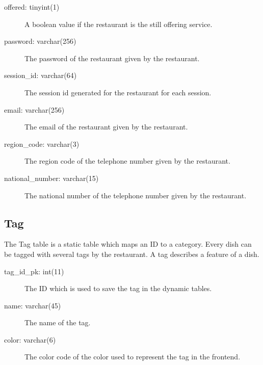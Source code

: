 \begin{description}
        \item[offered: tinyint(1)] A boolean value if the restaurant is the still offering service.
        \item[password: varchar(256)] The password of the restaurant given by the restaurant.
        \item[session\_id: varchar(64)] The session id generated for the restaurant for each session.
        \item[email: varchar(256)] The email of the restaurant given by the restaurant.            
        \item[region\_code: varchar(3)] The region code of the telephone number given by the restaurant.
        \item[national\_number: varchar(15)] The national number of the telephone number given by the restaurant.
    \end{description}

    \subsection{Tag}
    The Tag table is a static table which maps an ID to a category. Every dish can be tagged with several tags by the restaurant. A tag describes a feature of a dish.
    \begin{description}
        \item[tag\_id\_pk: int(11)] The ID which is used to save the tag in the dynamic tables.
        \item[name: varchar(45)] The name of the tag.
        \item[color: varchar(6)] The color code of the color used to represent the tag in the frontend.
    \end{description}

